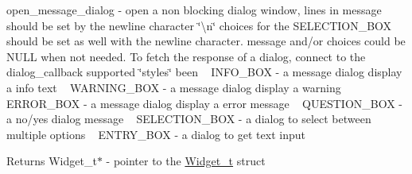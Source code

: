open\+\_\+message\+\_\+dialog -\/ open a non blocking dialog window, lines in message should be set by the newline character \char`\"{}\textbackslash{}n\char`\"{} choices for the S\+E\+L\+E\+C\+T\+I\+O\+N\+\_\+\+B\+OX should be set as well with the newline character. message and/or choices could be N\+U\+LL when not needed. To fetch the response of a dialog, connect to the dialog\+\_\+callback supported \char`\"{}styles\char`\"{} been ~\newline
I\+N\+F\+O\+\_\+\+B\+OX -\/ a message dialog display a info text ~\newline
W\+A\+R\+N\+I\+N\+G\+\_\+\+B\+OX -\/ a message dialog display a warning ~\newline
E\+R\+R\+O\+R\+\_\+\+B\+OX -\/ a message dialog display a error message ~\newline
Q\+U\+E\+S\+T\+I\+O\+N\+\_\+\+B\+OX -\/ a no/yes dialog message ~\newline
S\+E\+L\+E\+C\+T\+I\+O\+N\+\_\+\+B\+OX -\/ a dialog to select between multiple options ~\newline
E\+N\+T\+R\+Y\+\_\+\+B\+OX -\/ a dialog to get text input 

\begin{DoxyReturn}{Returns}
Widget\+\_\+t$\ast$ -\/ pointer to the \hyperlink{structWidget__t}{Widget\+\_\+t} struct 
\end{DoxyReturn}
